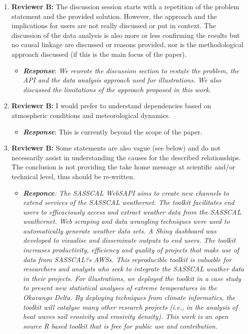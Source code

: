 \documentclass[a4paper, 12pt, conference]{ieeeconf}      %
\begin{document}
\begin{enumerate}
	\item  \textbf{Reviewer B:}  The discussion session starts with a repetition of the problem statement and the provided solution. However, the approach and the implications for users are not really discussed or put in context. The discussion of the data analysis is also more or less confirming the results but no causal linkage are discussed or reasons provided, nor is the methodological approach discussed (if this is the main focus of the paper). 
	
	\begin{itemize}
		\item \textbf{\emph{Response}}: \emph{We rewrote the discussion section to restate the problem, the API and the data analysis approach used  for illustrations.  We also discussed the limitations of the approach  proposed in this work.}
	\end{itemize}
	
	\item \textbf{Reviewer B:}  I would prefer to understand dependencies based on atmospheric conditions and meteorological dynamics. 
\begin{itemize}
	\item \textbf{\emph{Response}}: This is currently beyond the scope of the paper.
\end{itemize}

\item \textbf{Reviewer B:}  Some statements are also vague (see below) and do not necessarily assist in understanding the causes for the described relationships. The conclusion is not providing the take home message at scientific and/or technical level, thus should be re-written.
	\begin{itemize}
		\item  \emph{\textbf{Responce}: The SASSCAL WebSAPI aims to create new channels to
			extend services of the SASSCAL weathernet. The toolkit
			facilitates end users to efficaciously access and extract
			weather data from the SASSCAL weathernet. Web scraping
			and data wrangling techniques were used to automatically
			generate weather data sets. A Shiny dashboard was developed
			to visualise and disseminate outputs to end users. The toolkit
			increases productivity, efficiency and quality of projects that
			make use of data from SASSCAL?s AWSs. This reproducible
			toolkit is valuable for researchers and analysts who seek
			to integrate the SASSCAL weather data in their projects.
			For illustrations, we deployed the toolkit in a case study to
			present new statistical analyses of extreme temperatures in
			the Okavango Delta. By deploying techniques from climate
			informatics, the toolkit will catalyse many other research
			projects (i.e., in the analysis of heat waves soil erosivity
			and erosivity density). This work is an open source R based
			toolkit that is free for public use and contribution.}	
		

\end{itemize}
\end{enumerate}
\end{document}
